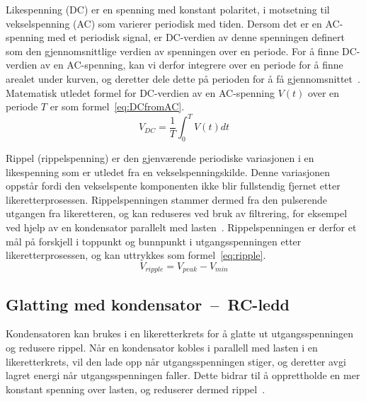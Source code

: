 Likespenning (DC) er en spenning med konstant polaritet, i motsetning til vekselspenning (AC) som varierer periodisk med tiden. Dersom det er en AC-spenning med et periodisk signal, er DC-verdien av denne spenningen definert som den gjennomsnittlige verdien av spenningen over en periode. For å finne DC-verdien av en AC-spenning, kan vi derfor integrere over en periode for å finne arealet under kurven, og deretter dele dette på perioden for å få gjennomsnittet~\cite{learningBook}. Matematisk utledet formel for DC-verdien av en AC-spenning $V(t)$ over en periode $T$ er som formel~\ref{eq:DCfromAC}.
\begin{equation}\label{eq:DCfromAC}
    V_{DC} = \frac{1}{T} \int_0^T V(t)  dt
\end{equation}

\noindent
Rippel (rippelspenning) er den gjenværende periodiske variasjonen i en likespenning som er utledet fra en vekselspenningskilde. Denne variasjonen oppstår fordi den vekselspente komponenten ikke blir fullstendig fjernet etter likeretterprosessen. Rippelspenningen stammer dermed fra den pulserende utgangen fra likeretteren, og kan reduseres ved bruk av filtrering, for eksempel ved hjelp av en kondensator parallelt med lasten~\cite{wikipediaRipple}. Rippelspenningen er derfor et mål på forskjell i toppunkt og bunnpunkt i utgangsspenningen etter likeretterprosessen, og kan uttrykkes som formel~\ref{eq:ripple}.
\begin{equation}\label{eq:ripple}
    V_{ripple} = V_{peak} - V_{min}
\end{equation}


\subsection{Glatting med kondensator~--~RC-ledd}\label{teo:glatting_kondensator}
Kondensatoren kan brukes i en likeretterkrets for å glatte ut utgangsspenningen og redusere rippel. Når en kondensator kobles i parallell med lasten i en likeretterkrets, vil den lade opp når utgangsspenningen stiger, og deretter avgi lagret energi når utgangsspenningen faller. Dette bidrar til å opprettholde en mer konstant spenning over lasten, og reduserer dermed rippel~\cite{wikipediaRectifiers}.

